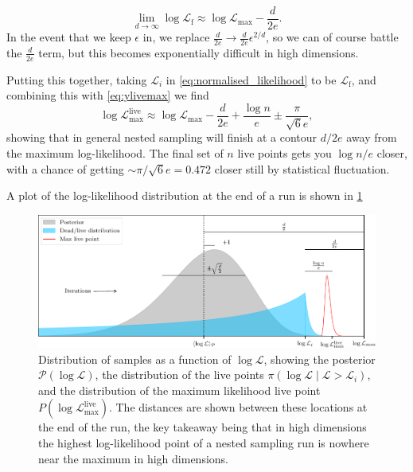 \documentclass[usenatbib]{mnras}
\begin{document}
\begin{equation}
    \lim_{d\to\infty} \log\mathcal{L}_\mathrm{f} \approx \log\mathcal{L}_\mathrm{max} - \frac{d}{2e}.
\end{equation}
In the event that we keep $\epsilon$ in, we replace $\frac{d}{2e}\to \frac{d}{2e}\epsilon^{2/d}$, so we can of course battle the $\frac{d}{2e}$ term, but this becomes exponentially difficult in high dimensions.
\par
Putting this together, taking $\mathcal{L}_i$ in \eqref{eq:normalised_likelihood} to be $\mathcal{L}_\mathrm{f}$, and combining this with \eqref{eq:ylivemax} we find
\begin{equation}
    \boxed{
        \log{\mathcal{L}}_\mathrm{max}^\mathrm{live} \approx \log\mathcal{L}_\mathrm{max} - \frac{d}{2e} + \frac{\log n}{e} \pm \frac{\pi}{\sqrt{6}e}
    },
\end{equation}
showing that in general nested sampling will finish at a contour $d/2e$ away from the maximum log-likelihood. The final set of $n$ live points gets you $\log n/e$ closer, with a chance of getting $\sim\pi/\sqrt{6}e=0.472$ closer still by statistical fluctuation. 
\par
A plot of the log-likelihood distribution at the end of a run is shown in \cref{fig:logL_distribution}
\begin{figure}
\begin{center}
    \includegraphics{figures/logL_distribution.pdf}
\end{center}
\caption{Distribution of samples as a function of $\log\mathcal{L}$, showing the posterior $\mathcal{P}(\log\mathcal{L})$, the distribution of the live points $\mathcal{\pi}(\log\mathcal{L} \mid \mathcal{L}>\mathcal{L}_i)$, and the distribution of the maximum likelihood live point $P(\log\mathcal{L}_\mathrm{max}^\mathrm{live})$. The distances are shown between these locations at the end of the run, the key takeaway being that in high dimensions the highest log-likelihood point of a nested sampling run is nowhere near the maximum in high dimensions.}
\label{fig:logL_distribution}
\end{figure}
\end{document}
